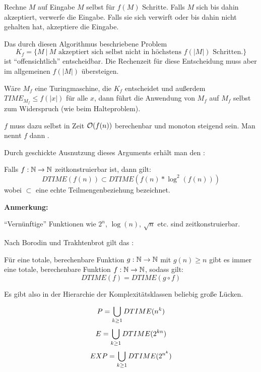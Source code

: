 Rechne $M$ auf Eingabe $M$ selbst für $f(M)$ Schritte. Falls $M$ sich bis dahin akzeptiert, verwerfe die Eingabe. Falls sie sich verwirft oder bis dahin nicht gehalten hat, akzeptiere die Eingabe.

Das durch diesen Algorithmus beschriebene Problem 
$$K_f = \{ M \ |\ M \text{ akzeptiert sich selbst nicht in höchstens } f(|M|) \text{ Schritten.} \}$$ 
ist ``offensichtlich'' entscheidbar. Die Rechenzeit für diese Entscheidung muss aber im allgemeinen $f(|M|)$ übersteigen.
    
Wäre $M_f$ eine Turingmaschine, die $K_f$ entscheidet und außerdem $TIME_{M_f} \leq f(|x|)$ für alle $x$, dann führt die Anwendung von $M_f$ auf $M_f$ selbst zum Widerspruch (wie beim Halteproblem).

$f$ muss dazu selbst in Zeit $\mathcal{O}(f(n))$ berechenbar und monoton steigend sein. Man nennt $f$ dann .

Durch geschickte Ausnutzung dieses Arguments erhält man den :

\begin{satz}
    Falls $f: \mathbb{N} \rightarrow \mathbb{N}$ zeitkonstruierbar ist, dann gilt:
    $$ DTIME(f(n)) \subset DTIME(f(n)*\log^2(f(n))) $$
    wobei $\subset$ eine echte Teilmengenbeziehung bezeichnet.
\end{satz}

\textbf{Anmerkung:}

``Vernünftige'' Funktionen wie $2^n$, $\log(n)$, $\sqrt{n}$ etc. sind zeitkonstruierbar.




\begin{satz}
    Nach Borodin und Trakhtenbrot gilt das :

    Für eine totale, berechenbare Funktion $g: \mathbb{N} \rightarrow \mathbb{N}$ mit $g(n) \geq n$ gibt es immer eine totale, berechenbare Funktion $f: \mathbb{N} \rightarrow \mathbb{N}$, sodass gilt:
    $$ DTIME(f) = DTIME (g \circ f) $$

    Es gibt also in der Hierarchie der Komplexitätsklassen beliebig große Lücken.
\end{satz}


\begin{definition}
    $$ P = \bigcup_{k \geq 1} DTIME(n^k) $$
    $$ E = \bigcup_{k \geq 1} DTIME(2^{kn}) $$
    $$ EXP = \bigcup_{k \geq 1} DTIME(2^{n^k}) $$
\end{definition}

